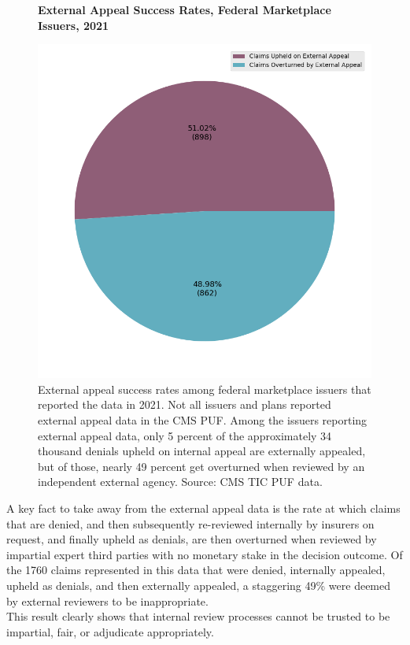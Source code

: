 \documentclass[12pt, a4paper]{report}
\begin{document}
\begin{figure}
	\centering
	\textbf{External Appeal Success Rates, Federal Marketplace Issuers, 2021}\par\medskip
	\includegraphics[width=0.85\columnwidth]{images/cms_puf/external_appeal_success_rates.png}
	\caption{External appeal success rates among federal marketplace issuers that reported the data in 2021. Not all issuers and plans reported external appeal data in the CMS PUF. Among the issuers reporting external appeal data, only 5 percent of the approximately 34 thousand denials upheld on internal appeal are externally appealed, but of those, nearly 49 percent get overturned when reviewed by an independent external agency. Source: CMS TIC PUF data.}
	\label{federal_external_appeal_success_rates}
\end{figure}

A key fact to take away from the external appeal data is the rate at which claims that are denied, and then subsequently re-reviewed internally by insurers on request, and finally upheld as denials, are then overturned when reviewed by impartial expert third parties with no monetary stake in the decision outcome. Of the 1760 claims represented in this data that were denied, internally appealed, upheld as denials, and then externally appealed, a staggering 49\% were deemed by external reviewers to be inappropriate.\\

This result clearly shows that internal review processes cannot be trusted to be impartial, fair, or adjudicate appropriately.\\
\end{document}
